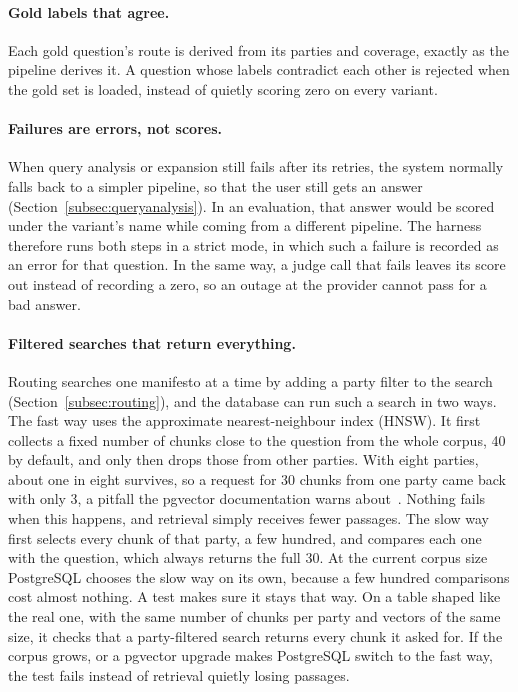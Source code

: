 \paragraph{Gold labels that agree.} Each gold question's route is derived from
its parties and coverage, exactly as the pipeline derives it. A question whose
labels contradict each other is rejected when the gold set is loaded, instead
of quietly scoring zero on every variant.

\paragraph{Failures are errors, not scores.} When query analysis or expansion
still fails after its retries, the system normally falls back to a simpler
pipeline, so that the user still gets an answer
(Section~\ref{subsec:queryanalysis}). In an evaluation, that answer would be
scored under the variant's name while coming from a different pipeline. The
harness therefore runs both steps in a strict mode, in which such a failure is
recorded as an error for that question. In the same way, a judge call that
fails leaves its score out instead of recording a zero, so an outage at the
provider cannot pass for a bad answer.

\paragraph{Filtered searches that return everything.} Routing searches one
manifesto at a time by adding a party filter to the search
(Section~\ref{subsec:routing}), and the database can run such a search in two
ways. The fast way uses the approximate nearest-neighbour index (HNSW). It
first collects a fixed number of chunks close to the question from the whole
corpus, 40 by default, and only then drops those from other parties. With
eight parties, about one in eight survives, so a request for 30 chunks from
one party came back with only 3, a pitfall the pgvector documentation warns
about~\citep{pgvector}. Nothing fails when this happens, and retrieval simply
receives fewer passages. The slow way first selects every chunk of that party,
a few hundred, and compares each one with the question, which always returns
the full 30. At the current corpus size PostgreSQL chooses the slow way on its
own, because a few hundred comparisons cost almost nothing. A test makes sure
it stays that way. On a table shaped like the real one, with the same number
of chunks per party and vectors of the same size, it checks that a
party-filtered search returns every chunk it asked for. If the corpus grows,
or a pgvector upgrade makes PostgreSQL switch to the fast way, the test fails
instead of retrieval quietly losing passages.

